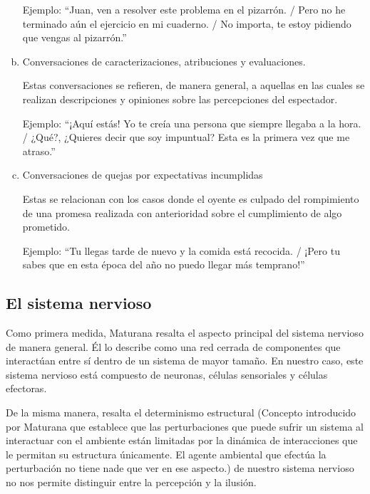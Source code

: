 \documentclass[10pt]{article}
\begin{document}
\begin{enumerate}[a.]
        Ejemplo: ``Juan, ven a resolver este problema en el pizarrón. / Pero no he terminado aún el ejercicio en mi cuaderno. / No importa, te estoy pidiendo que vengas al pizarrón.''
        
        \item Conversaciones de caracterizaciones, atribuciones y evaluaciones.
            
        Estas conversaciones se refieren, de manera general, a aquellas en las cuales se realizan descripciones y opiniones sobre las percepciones del espectador. 
                
        Ejemplo: ``¡Aquí estás! Yo te creía una persona que siempre llegaba a la hora. / ¿Qué?, ¿Quieres decir que soy impuntual? Esta es la primera vez que me atraso.''
        
        \item Conversaciones de quejas por expectativas incumplidas
            
        Estas se relacionan con los casos donde el oyente es culpado del rompimiento de una promesa realizada con anterioridad sobre el cumplimiento de algo prometido.
                
        Ejemplo: ``Tu llegas tarde de nuevo y la comida está recocida. / ¡Pero tu sabes que en esta época del año no puedo llegar más temprano!''

        \end{enumerate}

        \subsection{El sistema nervioso}

        Como primera medida, Maturana resalta el aspecto principal del sistema nervioso de manera general. Él lo describe como una red cerrada de componentes que interactúan entre sí dentro de un sistema de mayor tamaño. En nuestro caso, este sistema nervioso está compuesto de neuronas, células sensoriales y células efectoras. 

        De la misma manera, resalta el determinismo estructural (Concepto introducido por Maturana que establece que las perturbaciones que puede sufrir un sistema al interactuar con el ambiente están limitadas por la dinámica de interacciones que le permitan su estructura únicamente. El agente ambiental que efectúa la perturbación no tiene nade que ver en ese aspecto.) de nuestro sistema nervioso no nos permite distinguir entre la percepción y la ilusión. 
\end{document}
